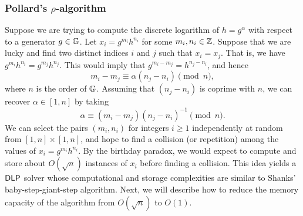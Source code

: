 \subsubsection{Pollard's $\rho$-algorithm}
Suppose we are trying to compute the discrete logarithm of $h = g^\alpha$ 
with respect to a generator $g \in \mathbb{G}$. Let $x_i = g^{m_i} h^{n_i}$ for some 
$m_i, n_i \in \mathbb{Z}$. Suppose that we are lucky and find two distinct indices 
$i$ and $j$ such that $x_i = x_j$. That is, we have $g^{m_i} h^{n_i} 
= g^{m_j} h^{n_j}$. This would imply that $g^{m_i-m_j} = h^{n_j-n_i}$, and hence 
\[ m_i - m_j \equiv \alpha(n_j - n_i) \pmod n, \] 
where $n$ is the order of $\mathbb{G}$. Assuming that $(n_j - n_i)$ is coprime with $n$, 
we can recover $\alpha \in [1, n]$ by taking 
\[ \alpha \equiv (m_i - m_j)(n_j - n_i)^{-1} \pmod n. \] 
We can select the pairs $(m_i, n_i)$ for integers $i \geq 1$ independently at 
random from $[1, n] \times [1, n]$, and hope to find a collision (or repetition) 
among the values of $x_i = g^{m_i} h^{n_i}$. By the birthday paradox, we would expect 
to compute and store about $O(\sqrt n)$ instances of $x_i$ before finding a 
collision. This idea yields a ${\sf DLP}$ solver whose computational and storage 
complexities are similar to Shanks' baby-step-giant-step algorithm. Next, 
we will describe how to reduce the memory capacity of the algorithm from 
$O(\sqrt n)$ to $O(1)$. 

